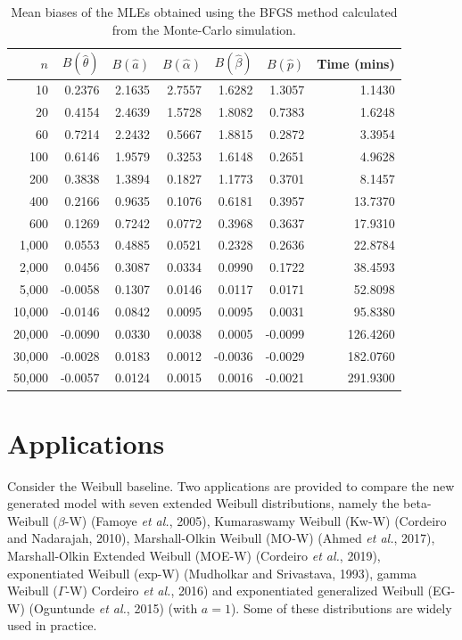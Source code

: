 \documentclass[12pt,a4paper]{article} %
\begin{document}
\begin{table}[H]
	\centering
	\caption{Mean biases of the MLEs obtained using the BFGS method calculated from the Monte-Carlo simulation.}\label{tab:bias}
	\begin{tabular}{rrrrrrr}
		\hline
		$n$ & $B(\hat{\theta})$ & $B(\hat{a})$ & $B(\hat{\alpha})$ & $B(\hat{\beta})$ & $B(\hat{p})$ & Time (mins)\\
		\hline
		10 & 0.2376 & 2.1635 & 2.7557 & 1.6282 & 1.3057 & 1.1430\\
		20 & 0.4154 & 2.4639 & 1.5728 & 1.8082 & 0.7383 & 1.6248\\
		60 & 0.7214 & 2.2432 & 0.5667 & 1.8815 & 0.2872 & 3.3954\\
		100 & 0.6146 & 1.9579 & 0.3253 & 1.6148 & 0.2651 & 4.9628\\
		200 & 0.3838 & 1.3894 & 0.1827 & 1.1773 & 0.3701 & 8.1457\\
		400 & 0.2166 & 0.9635 & 0.1076 & 0.6181 & 0.3957 & 13.7370\\
		600 & 0.1269 & 0.7242 & 0.0772 & 0.3968 & 0.3637 & 17.9310\\
		1,000 & 0.0553 & 0.4885 & 0.0521 & 0.2328 & 0.2636 & 22.8784 \\
		2,000  &  0.0456 & 0.3087 &  0.0334 &  0.0990 & 0.1722 &  38.4593\\
		5,000 & -0.0058 & 0.1307 & 0.0146 & 0.0117 & 0.0171 & 52.8098\\
		10,000 & -0.0146 & 0.0842 & 0.0095 & 0.0095 & 0.0031 & 95.8380\\
		20,000 & -0.0090 & 0.0330 & 0.0038 & 0.0005 & -0.0099 & 126.4260\\
		30,000 & -0.0028 & 0.0183 & 0.0012 & -0.0036 & -0.0029 & 182.0760\\
		50,000 & -0.0057 & 0.0124 & 0.0015 & 0.0016 & -0.0021 & 291.9300\\
		\hline
	\end{tabular}
\end{table}


\section{Applications}\label{applications}

Consider the Weibull baseline. Two applications are provided to compare the new generated model with seven extended Weibull
distributions, namely the beta-Weibull ($\beta$-W) (Famoye {\it et al.}, 2005), Kumaraswamy Weibull (Kw-W) (Cordeiro and Nadarajah, 2010),
Marshall-Olkin Weibull (MO-W) (Ahmed {\it et al.}, 2017), Marshall-Olkin Extended Weibull (MOE-W) (Cordeiro {\it et al.}, 2019),
exponentiated Weibull (exp-W) (Mudholkar and Srivastava, 1993), gamma Weibull ($\Gamma$-W) Cordeiro {\it et al.}, 2016) and exponentiated
generalized Weibull (EG-W) (Oguntunde {\it et al.}, 2015) (with $a=1$). Some of these distributions are widely used in practice.
\end{document}
